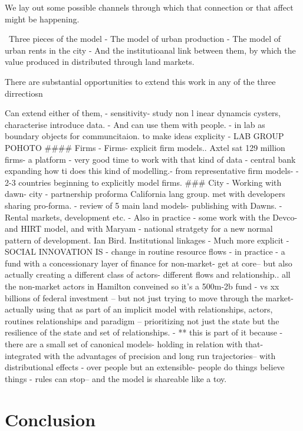 \documentclass[]{article}
\begin{document}
We lay out some possible channels through which that connection or that affect might be happening.


\
Three pieces of the model 
- The model of urban production
- The model of urban rents in the city
- And the institutioanal link between them, by which the value produced in distributed through land markets.

There are substantial opportunities to extend this work in any of the three dirrectiosn

Can extend either of them,
- sensitivity- study non l inear dynamcis cysters, characterise introduce data.
- And can use them with people. - in lab as boundary objects for communcitaion. to make ideas explicity - LAB GROUP POHOTO
#### Firms
- Firms- explicit firm models.. Axtel sat 129 million firms- a platform - very good time to work with that kind of data
- central bank expanding how ti does this kind of modelling.- from representative firm models- - 2-3 countries beginning to explicitly model firms.
### City
- Working with dawn- city - partnership proforma California lang group. met with developers sharing pro-forma. - review of 5 main land models- publishing with Dawns. - Rental markets, development etc.
- Also in practice - some work with the Devco- and HIRT model, and with Maryam - national stratgety for a new normal pattern of development. Ian Bird.
Institutional linkages
- Much more explicit - SOCIAL INNOVATION IS - change in routine resource flows
- in practice - a fund with a concessionary layer of finance for non-market- get at core-- but also actually creating a different class of actors- different flows and relationship.. all the non-market actors in Hamilton conveined so it's a 500m-2b fund - vs xx billions of federal investment -- but not just trying to move through the market- actually using that as part of an implicit model with relationships, actors, routines relationships and paradigm -- prioritizing not just the state but the resilience of the state and set of relationships.
- ** this is part of it because - there are a small set of canonical models- holding in relation with that- integrated with the advantages of precision and long run trajectories-- with distributional effects - over people but an extensible- people do things believe things - rules can stop-- and the model is shareable like a toy.

\section{Conclusion}
\end{document}
